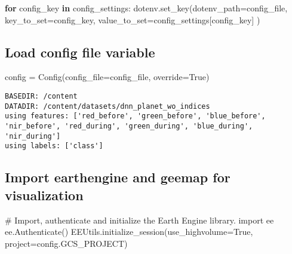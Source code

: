 \documentclass[
  letterpaper,
  DIV=11,
  numbers=noendperiod]{scrreprt}
\newenvironment{Shaded}{\begin{snugshade}}{\end{snugshade}}
\newcommand{\CommentTok}[1]{\textcolor[rgb]{0.37,0.37,0.37}{#1}}
\newcommand{\ControlFlowTok}[1]{\textcolor[rgb]{0.00,0.23,0.31}{\textbf{#1}}}
\newcommand{\ImportTok}[1]{\textcolor[rgb]{0.00,0.46,0.62}{#1}}
\newcommand{\KeywordTok}[1]{\textcolor[rgb]{0.00,0.23,0.31}{\textbf{#1}}}
\newcommand{\NormalTok}[1]{\textcolor[rgb]{0.00,0.23,0.31}{#1}}
\newcommand{\OperatorTok}[1]{\textcolor[rgb]{0.37,0.37,0.37}{#1}}
\newcommand{\VariableTok}[1]{\textcolor[rgb]{0.07,0.07,0.07}{#1}}
\begin{document}
\begin{Shaded}
\begin{Highlighting}[]
\ControlFlowTok{for}\NormalTok{ config\_key }\KeywordTok{in}\NormalTok{ config\_settings:}
\NormalTok{    dotenv.set\_key(dotenv\_path}\OperatorTok{=}\NormalTok{config\_file,}
\NormalTok{                   key\_to\_set}\OperatorTok{=}\NormalTok{config\_key,}
\NormalTok{                   value\_to\_set}\OperatorTok{=}\NormalTok{config\_settings[config\_key]}
\NormalTok{                   )}
\end{Highlighting}
\end{Shaded}

\subsection{Load config file variable}\label{load-config-file-variable}

\begin{Shaded}
\begin{Highlighting}[]
\NormalTok{config }\OperatorTok{=}\NormalTok{ Config(config\_file}\OperatorTok{=}\NormalTok{config\_file, override}\OperatorTok{=}\VariableTok{True}\NormalTok{)}
\end{Highlighting}
\end{Shaded}

\begin{verbatim}
BASEDIR: /content
DATADIR: /content/datasets/dnn_planet_wo_indices
using features: ['red_before', 'green_before', 'blue_before', 'nir_before', 'red_during', 'green_during', 'blue_during', 'nir_during']
using labels: ['class']
\end{verbatim}

\subsection{Import earthengine and geemap for
visualization}\label{import-earthengine-and-geemap-for-visualization}

\begin{Shaded}
\begin{Highlighting}[]
\CommentTok{\# Import, authenticate and initialize the Earth Engine library.}
\ImportTok{import}\NormalTok{ ee}
\NormalTok{ee.Authenticate()}
\NormalTok{EEUtils.initialize\_session(use\_highvolume}\OperatorTok{=}\VariableTok{True}\NormalTok{, project}\OperatorTok{=}\NormalTok{config.GCS\_PROJECT)}
\end{Highlighting}
\end{Shaded}
\end{document}
